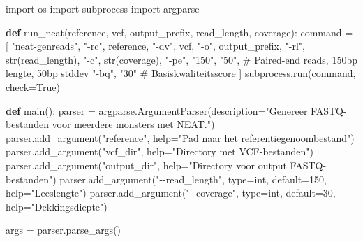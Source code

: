 \documentclass[
  letterpaper,
  DIV=11,
  numbers=noendperiod]{scrartcl}
\newenvironment{Shaded}{\begin{snugshade}}{\end{snugshade}}
\newcommand{\BuiltInTok}[1]{\textcolor[rgb]{0.00,0.23,0.31}{#1}}
\newcommand{\CommentTok}[1]{\textcolor[rgb]{0.37,0.37,0.37}{#1}}
\newcommand{\DecValTok}[1]{\textcolor[rgb]{0.68,0.00,0.00}{#1}}
\newcommand{\ImportTok}[1]{\textcolor[rgb]{0.00,0.46,0.62}{#1}}
\newcommand{\KeywordTok}[1]{\textcolor[rgb]{0.00,0.23,0.31}{\textbf{#1}}}
\newcommand{\NormalTok}[1]{\textcolor[rgb]{0.00,0.23,0.31}{#1}}
\newcommand{\OperatorTok}[1]{\textcolor[rgb]{0.37,0.37,0.37}{#1}}
\newcommand{\StringTok}[1]{\textcolor[rgb]{0.13,0.47,0.30}{#1}}
\newcommand{\VariableTok}[1]{\textcolor[rgb]{0.07,0.07,0.07}{#1}}
\begin{document}
\begin{Shaded}
\begin{Highlighting}[]
\ImportTok{import}\NormalTok{ os}
\ImportTok{import}\NormalTok{ subprocess}
\ImportTok{import}\NormalTok{ argparse}

\KeywordTok{def}\NormalTok{ run\_neat(reference, vcf, output\_prefix, read\_length, coverage):}
\NormalTok{    command }\OperatorTok{=}\NormalTok{ [}
        \StringTok{"neat{-}genreads"}\NormalTok{,}
        \StringTok{"{-}rc"}\NormalTok{, reference,}
        \StringTok{"{-}dv"}\NormalTok{, vcf,}
        \StringTok{"{-}o"}\NormalTok{, output\_prefix,}
        \StringTok{"{-}rl"}\NormalTok{, }\BuiltInTok{str}\NormalTok{(read\_length),}
        \StringTok{"{-}c"}\NormalTok{, }\BuiltInTok{str}\NormalTok{(coverage),}
        \StringTok{"{-}pe"}\NormalTok{, }\StringTok{"150"}\NormalTok{, }\StringTok{"50"}\NormalTok{,  }\CommentTok{\# Paired{-}end reads, 150bp lengte, 50bp stddev}
        \StringTok{"{-}bq"}\NormalTok{, }\StringTok{"30"}  \CommentTok{\# Basiskwaliteitsscore}
\NormalTok{    ]}
\NormalTok{    subprocess.run(command, check}\OperatorTok{=}\VariableTok{True}\NormalTok{)}

\KeywordTok{def}\NormalTok{ main():}
\NormalTok{    parser }\OperatorTok{=}\NormalTok{ argparse.ArgumentParser(description}\OperatorTok{=}\StringTok{"Genereer FASTQ{-}bestanden voor meerdere monsters met NEAT."}\NormalTok{)}
\NormalTok{    parser.add\_argument(}\StringTok{"reference"}\NormalTok{, }\BuiltInTok{help}\OperatorTok{=}\StringTok{"Pad naar het referentiegenoombestand"}\NormalTok{)}
\NormalTok{    parser.add\_argument(}\StringTok{"vcf\_dir"}\NormalTok{, }\BuiltInTok{help}\OperatorTok{=}\StringTok{"Directory met VCF{-}bestanden"}\NormalTok{)}
\NormalTok{    parser.add\_argument(}\StringTok{"output\_dir"}\NormalTok{, }\BuiltInTok{help}\OperatorTok{=}\StringTok{"Directory voor output FASTQ{-}bestanden"}\NormalTok{)}
\NormalTok{    parser.add\_argument(}\StringTok{"{-}{-}read\_length"}\NormalTok{, }\BuiltInTok{type}\OperatorTok{=}\BuiltInTok{int}\NormalTok{, default}\OperatorTok{=}\DecValTok{150}\NormalTok{, }\BuiltInTok{help}\OperatorTok{=}\StringTok{"Leeslengte"}\NormalTok{)}
\NormalTok{    parser.add\_argument(}\StringTok{"{-}{-}coverage"}\NormalTok{, }\BuiltInTok{type}\OperatorTok{=}\BuiltInTok{int}\NormalTok{, default}\OperatorTok{=}\DecValTok{30}\NormalTok{, }\BuiltInTok{help}\OperatorTok{=}\StringTok{"Dekkingsdiepte"}\NormalTok{)}

\NormalTok{    args }\OperatorTok{=}\NormalTok{ parser.parse\_args()}


\end{Highlighting}
\end{Shaded}
\end{document}
